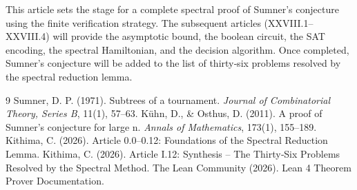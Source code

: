\documentclass[11pt,a4paper]{article}
\begin{document}
This article sets the stage for a complete spectral proof of Sumner's conjecture using the finite verification strategy. The subsequent articles (XXVIII.1–XXVIII.4) will provide the asymptotic bound, the boolean circuit, the SAT encoding, the spectral Hamiltonian, and the decision algorithm. Once completed, Sumner's conjecture will be added to the list of thirty‑six problems resolved by the spectral reduction lemma.


\begin{thebibliography}{9}
  Sumner, D. P. (1971). Subtrees of a tournament. \emph{Journal of Combinatorial Theory, Series B}, 11(1), 57–63.
  Kühn, D., \& Osthus, D. (2011). A proof of Sumner's conjecture for large n. \emph{Annals of Mathematics}, 173(1), 155–189.
  Kithima, C. (2026). Article 0.0–0.12: Foundations of the Spectral Reduction Lemma.
  Kithima, C. (2026). Article I.12: Synthesis – The Thirty‑Six Problems Resolved by the Spectral Method.
  The Lean Community (2026). Lean 4 Theorem Prover Documentation.
\end{thebibliography}
\end{document}
